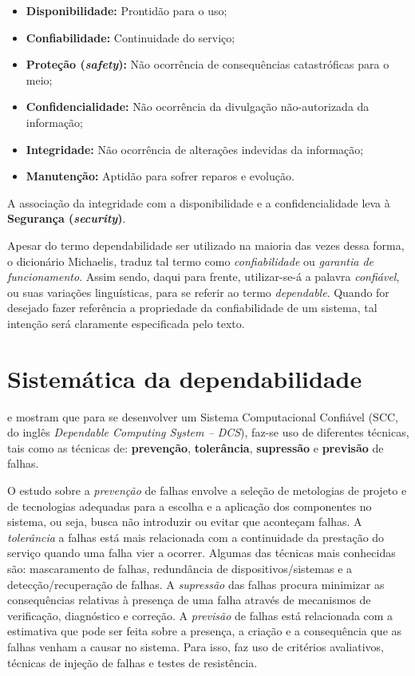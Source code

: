 \begin{itemize}
    \item {\bf Disponibilidade:} Prontidão para o uso;
    \item {\bf Confiabilidade:} Continuidade do serviço;
    \item \textbf{Proteção (\textit{safety}):} Não ocorrência de consequências
          catastróficas para o meio;
    \item {\bf Confidencialidade:} Não ocorrência da divulgação não-autorizada
          da informação;
    \item {\bf Integridade:} Não ocorrência de alterações indevidas da
          informação;
    \item {\bf Manutenção:} Aptidão para sofrer reparos e evolução.
\end{itemize}

A associação da integridade com a disponibilidade e a confidencialidade leva à
\textbf{Segurança (\textit{security})}.

Apesar do termo dependabilidade ser utilizado na maioria das vezes dessa forma,
o dicionário Michaelis, traduz tal termo como {\it confiabilidade} ou {\it
garantia de funcionamento}. Assim sendo, daqui para frente, utilizar-se-á a
palavra {\it confiável}, ou suas variações linguísticas, para se referir ao
termo {\it dependable}. Quando for desejado fazer referência a propriedade da
confiabilidade de um sistema, tal intenção será claramente especificada pelo
texto.

\section{Sistemática da dependabilidade}
 e  mostram que para se
desenvolver um Sistema Computacional Confiável (SCC, do inglês {\it Dependable
Computing System -- DCS}), faz-se uso de diferentes técnicas, tais como as
técnicas de: {\bf prevenção}, {\bf tolerância}, {\bf supressão} e {\bf previsão}
de falhas.

O estudo sobre a {\it prevenção} de falhas envolve a seleção de metologias de
projeto e de tecnologias adequadas para a escolha e a aplicação dos componentes
no sistema, ou seja, busca não introduzir ou evitar que aconteçam falhas. A {\it
tolerância} a falhas está mais relacionada com a continuidade da prestação do
serviço quando uma falha vier a ocorrer. Algumas das técnicas mais conhecidas
são: mascaramento de falhas, redundância de dispositivos/sistemas e a
detecção/recuperação de falhas. A {\it supressão} das falhas procura minimizar
as consequências relativas à presença de uma falha através de mecanismos de
verificação, diagnóstico e correção. A {\it previsão} de falhas está relacionada
com a estimativa que pode ser feita sobre a presença, a criação e a consequência
que as falhas venham a causar no sistema. Para isso, faz uso de critérios
avaliativos, técnicas de injeção de falhas e testes de resistência.

